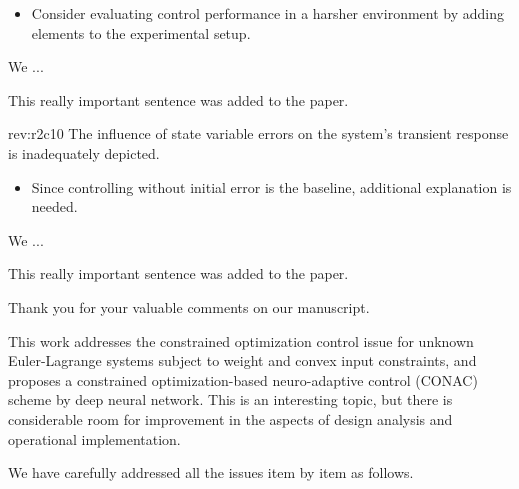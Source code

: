 \documentclass[12pt,english]{reviewresponse}
\begin{document}
\begin{howtoanswer}
    \begin{itemize}
        \item Consider evaluating control performance in a harsher environment by adding elements to the experimental setup.
    \end{itemize}
\end{howtoanswer}

\begin{revresponse}
    We ...
    \begin{changes}
        This really important sentence was added to the paper.
    \end{changes}
\end{revresponse}

\begin{revcomment}[2]{rev:r2c10}
    The influence of state variable errors on the system's transient response is inadequately depicted.
\end{revcomment}

\begin{howtoanswer}
    \begin{itemize}
        \item Since controlling without initial error is the baseline, additional explanation is needed.
    \end{itemize}
\end{howtoanswer}

\begin{revresponse}
    We ...
    \begin{changes}
        This really important sentence was added to the paper.
    \end{changes}
\end{revresponse}

\begin{concludingresponse}[]
    Thank you for your valuable comments on our manuscript. 
\end{concludingresponse}

\reviewer
\begin{generalcomment}
    This work addresses the constrained optimization control issue for unknown Euler-Lagrange systems subject to weight and convex input constraints, and proposes a constrained optimization-based neuro-adaptive control (CONAC) scheme by deep neural network. This is an interesting topic, but there is considerable room for improvement in the aspects of design analysis and operational implementation. 
\end{generalcomment}
\begin{revresponse}
    We have carefully addressed all the issues item by item as follows.
\end{revresponse}
\end{document}
